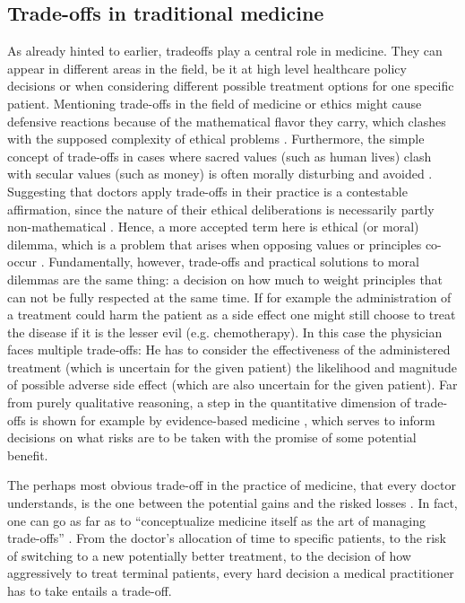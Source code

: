 \subsection{Trade-offs in traditional medicine}
    As already hinted to earlier, tradeoffs play a central role in medicine.
	They can appear in different areas in the field, be it at high level healthcare policy decisions or when considering different possible treatment options for one specific patient.
    Mentioning trade-offs in the field of medicine or ethics might cause defensive reactions because of the mathematical flavor they carry, which clashes with the supposed complexity of ethical problems \cite{Williamson2021}.
    Furthermore, the simple concept of trade-offs in cases where sacred values (such as human lives) clash with secular values (such as money) is often morally disturbing and avoided \cite{Tetlock2003}.
    Suggesting that doctors apply trade-offs in their practice is a contestable affirmation, since the nature of their ethical deliberations is necessarily partly non-mathematical .
    Hence, a more accepted term here is ethical (or moral) dilemma, which is a problem that arises when opposing values or principles co-occur \cite[p.~351]{Dijkstra2020}.
    Fundamentally, however, trade-offs and practical solutions to moral dilemmas are the same thing: a decision on how much to weight principles that can not be fully respected at the same time.
    If for example the administration of a treatment could harm the patient as a side effect one might still choose to treat the disease if it is the lesser evil (e.g. chemotherapy\cite{oronsky2016medical}).
    In this case the physician faces multiple trade-offs:
	He has to consider the effectiveness of the administered treatment (which is uncertain for the given patient) the likelihood and magnitude of possible adverse side effect (which are also uncertain for the given patient).
    Far from purely qualitative reasoning, a step in the quantitative dimension of trade-offs is shown for example by evidence-based medicine \cite{Launer2020}, which serves to inform decisions on what risks are to be taken with the promise of some potential benefit.

    The perhaps most obvious trade-off in the practice of medicine, that every doctor understands, is the one between the potential gains and the risked losses \cite{Launer2020}.
    In fact, one can go as far as to ``conceptualize medicine itself as the art of managing trade-offs'' \cite{Launer2020}.
    From the doctor's allocation of time to specific patients, to the risk of switching to a new potentially better treatment, to the decision of how aggressively to treat terminal patients, every hard decision a medical practitioner has to take entails a trade-off.


